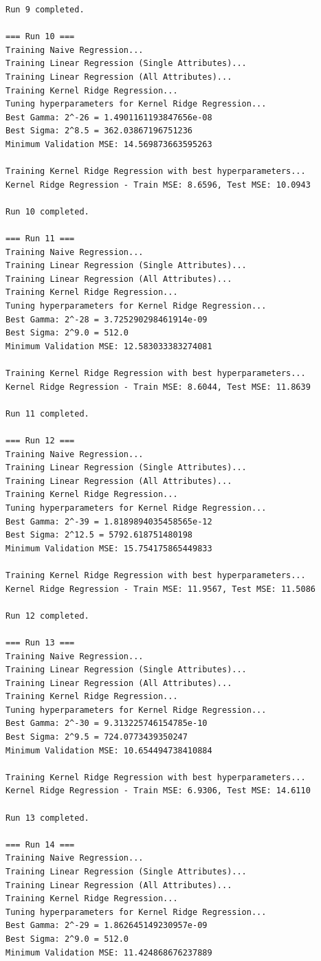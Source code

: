 \documentclass[final,3p,times,12pt]{article}
\begin{document}
\begin{verbatim}
Run 9 completed.

=== Run 10 ===
Training Naive Regression...
Training Linear Regression (Single Attributes)...
Training Linear Regression (All Attributes)...
Training Kernel Ridge Regression...
Tuning hyperparameters for Kernel Ridge Regression...
Best Gamma: 2^-26 = 1.4901161193847656e-08
Best Sigma: 2^8.5 = 362.03867196751236
Minimum Validation MSE: 14.569873663595263

Training Kernel Ridge Regression with best hyperparameters...
Kernel Ridge Regression - Train MSE: 8.6596, Test MSE: 10.0943

Run 10 completed.

=== Run 11 ===
Training Naive Regression...
Training Linear Regression (Single Attributes)...
Training Linear Regression (All Attributes)...
Training Kernel Ridge Regression...
Tuning hyperparameters for Kernel Ridge Regression...
Best Gamma: 2^-28 = 3.725290298461914e-09
Best Sigma: 2^9.0 = 512.0
Minimum Validation MSE: 12.583033383274081

Training Kernel Ridge Regression with best hyperparameters...
Kernel Ridge Regression - Train MSE: 8.6044, Test MSE: 11.8639

Run 11 completed.

=== Run 12 ===
Training Naive Regression...
Training Linear Regression (Single Attributes)...
Training Linear Regression (All Attributes)...
Training Kernel Ridge Regression...
Tuning hyperparameters for Kernel Ridge Regression...
Best Gamma: 2^-39 = 1.8189894035458565e-12
Best Sigma: 2^12.5 = 5792.618751480198
Minimum Validation MSE: 15.754175865449833

Training Kernel Ridge Regression with best hyperparameters...
Kernel Ridge Regression - Train MSE: 11.9567, Test MSE: 11.5086

Run 12 completed.

=== Run 13 ===
Training Naive Regression...
Training Linear Regression (Single Attributes)...
Training Linear Regression (All Attributes)...
Training Kernel Ridge Regression...
Tuning hyperparameters for Kernel Ridge Regression...
Best Gamma: 2^-30 = 9.313225746154785e-10
Best Sigma: 2^9.5 = 724.0773439350247
Minimum Validation MSE: 10.654494738410884

Training Kernel Ridge Regression with best hyperparameters...
Kernel Ridge Regression - Train MSE: 6.9306, Test MSE: 14.6110

Run 13 completed.

=== Run 14 ===
Training Naive Regression...
Training Linear Regression (Single Attributes)...
Training Linear Regression (All Attributes)...
Training Kernel Ridge Regression...
Tuning hyperparameters for Kernel Ridge Regression...
Best Gamma: 2^-29 = 1.862645149230957e-09
Best Sigma: 2^9.0 = 512.0
Minimum Validation MSE: 11.424868676237889


\end{verbatim}
\end{document}
